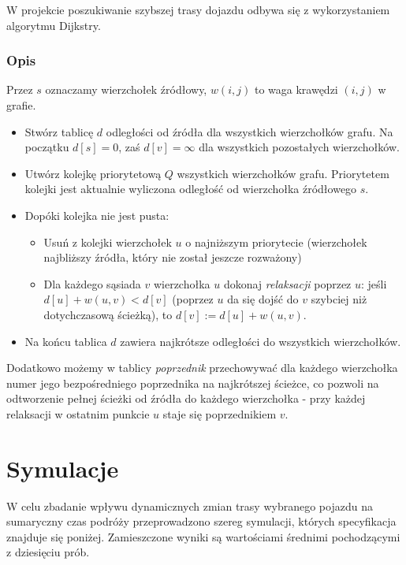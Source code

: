 \documentclass[11pt,a4paper]{article}
\begin{document}
W projekcie poszukiwanie szybszej trasy dojazdu odbywa się z wykorzystaniem algorytmu Dijkstry.

\subsubsection{Opis}

Przez $s$ oznaczamy wierzchołek źródłowy, $w(i, j)$ to waga krawędzi $(i, j)$ w grafie.

\begin{itemize}
	\item Stwórz tablicę $d$ odległości od źródła dla wszystkich wierzchołków grafu. Na początku $d[s]=0$, zaś $d[v]=\infty$ dla wszystkich pozostałych wierzchołków.
	\item Utwórz kolejkę priorytetową $Q$ wszystkich wierzchołków grafu. Priorytetem kolejki jest aktualnie wyliczona odległość od wierzchołka źródłowego $s$.
	\item Dopóki kolejka nie jest pusta:
	\begin{itemize}
		\item Usuń z kolejki wierzchołek $u$ o najniższym priorytecie (wierzchołek najbliższy źródła, który nie został jeszcze rozważony)
		\item Dla każdego sąsiada $v$ wierzchołka $u$ dokonaj \textit{relaksacji} poprzez $u$: jeśli $d[u] + w(u, v) < d[v]$ (poprzez $u$ da się dojść do $v$ szybciej niż dotychczasową ścieżką), to $d[v] := d[u] + w(u, v)$.
	\end{itemize}
	\item Na końcu tablica $d$ zawiera najkrótsze odległości do wszystkich wierzchołków.
\end{itemize}

Dodatkowo możemy w tablicy \textit{poprzednik} przechowywać dla każdego wierzchołka numer jego bezpośredniego poprzednika na najkrótszej ścieżce, co pozwoli na odtworzenie pełnej ścieżki od źródła do każdego wierzchołka - przy każdej relaksacji w ostatnim punkcie $u$ staje się poprzednikiem $v$.

\section{Symulacje}

W celu zbadanie wpływu dynamicznych zmian trasy wybranego pojazdu na sumaryczny czas podróży przeprowadzono szereg symulacji, których specyfikacja znajduje się poniżej. Zamieszczone wyniki są wartościami średnimi pochodzącymi z dziesięciu prób.
\end{document}
